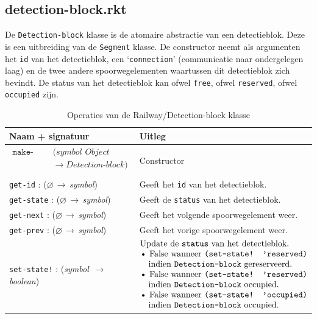 \documentclass[a4paper, 11pt]{article}
\newcommand{\naar}{\,$\rightarrow$\,}
\renewcommand{\empty}{$\varnothing$}
\newcommand{\<}{\scriptsize\textless\normalsize}
\renewcommand{\>}{\scriptsize\textgreater\normalsize}
\begin{document}
\subsection{detection-block.rkt} %
De \texttt{Detection-block} klasse is de atomaire abstractie van een detectieblok. Deze is een uitbreiding van de \texttt{Segment} klasse. De constructor neemt als argumenten het \texttt{id} van het detectieblok, een \lq\texttt{connection}' (communicatie naar ondergelegen laag) en de twee andere spoorwegelementen waartussen dit detectieblok zich bevindt. De status van het detectieblok kan ofwel \texttt{free}, ofwel \texttt{reserved}, ofwel \texttt{occupied} zijn.
\begin{table}[H]
	\begin{center}
		{
		\begin{tabular}{|l l|}
			\hline
			\textbf{Naam + signatuur} & \textbf{Uitleg}\\
			\hline
			$\begin{matrix}
				\texttt{make-object} & (\textit{symbol Object symbol symbol} \\
				& \rightarrow \textit{Detection-block})\\
			\end{matrix}$
			& Constructor \\
			\hline
			\texttt{get-id} : (\empty \naar \textit{symbol}) & Geeft het \texttt{id} van het detectieblok.\\
			\texttt{get-state} : (\empty \naar \textit{symbol}) & Geeft de \texttt{status} van het detectieblok.\\
			\texttt{get-next} : (\empty \naar \textit{symbol}) & Geeft het volgende spoorwegelement weer.\\
			\texttt{get-prev} : (\empty \naar \textit{symbol}) & Geeft het vorige spoorwegelement weer.\\
			\texttt{set-state!} : (\textit{symbol} \naar \textit{boolean}) & 
			$\begin{matrix*}[l]
				\text{Update de \texttt{status} van het detectieblok.}\\
				\text{• False wanneer \texttt{(set-state! 'reserved)}}\\
				\text{\quad indien \texttt{Detection-block} gereserveerd.}\\
			 	\text{• False wanneer \texttt{(set-state! 'reserved)}}\\
			  \text{\quad indien \texttt{Detection-block} occupied.}\\
			 	\text{• False wanneer \texttt{(set-state! 'occupied)}}\\
			  \text{\quad indien \texttt{Detection-block} occupied.}\\
		\end{matrix*}$\\
		\hline
		\end{tabular}}
		\caption{Operaties van de Railway/Detection-block klasse}
	\end{center}
\end{table}
\end{document}
